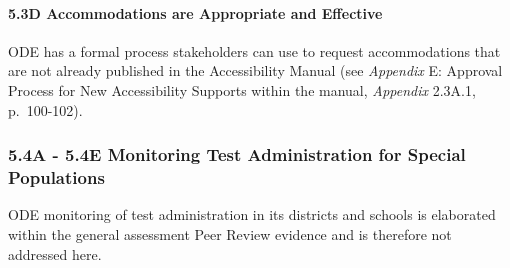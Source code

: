 \documentclass[]{article}
\let\oldparagraph\paragraph
\renewcommand{\paragraph}[1]{\oldparagraph{#1}\mbox{}}
\begin{document}
\hypertarget{d-accommodations-are-appropriate-and-effective}{%
\paragraph{5.3D Accommodations are Appropriate and
Effective}\label{d-accommodations-are-appropriate-and-effective}}

ODE has a formal process stakeholders can use to request accommodations
that are not already published in the Accessibility Manual (see
\emph{Appendix} E: Approval Process for New Accessibility Supports
within the manual, \emph{Appendix} 2.3A.1, p.~100-102).

\hypertarget{a---5.4e-monitoring-test-administration-for-special-populations}{%
\subsubsection{5.4A - 5.4E Monitoring Test Administration for Special
Populations}\label{a---5.4e-monitoring-test-administration-for-special-populations}}

ODE monitoring of test administration in its districts and schools is
elaborated within the general assessment Peer Review evidence and is
therefore not addressed here.
\end{document}
